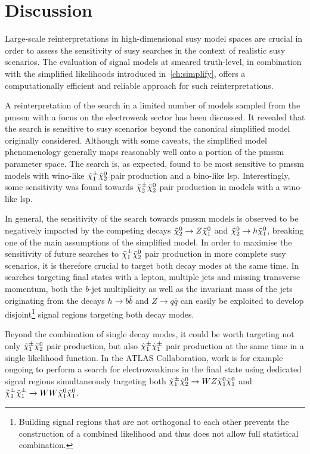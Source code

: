 \section{Discussion}

Large-scale reinterpretations in high-dimensional \gls{susy} model spaces are crucial in order to assess the sensitivity of \gls{susy} searches in the context of realistic \gls{susy} scenarios. The evaluation of signal models at smeared truth-level, in combination with the simplified likelihoods introduced in~\cref{ch:simplify}, offers a computationally efficient and reliable approach for such reinterpretations.

A reinterpretation of the \onelepton search in a limited number of models sampled from the \gls{pmssm} with a focus on the electroweak sector has been discussed. It revealed that the \onelepton search is sensitive to \gls{susy} scenarios beyond the canonical simplified model originally considered.
Although with some caveats, the simplified model phenomenology generally maps reasonably well onto a portion of the \gls{pmssm} parameter space. The \onelepton search is, as expected, found to be most sensitive to \gls{pmssm} models with wino-like $\tilde{\chi}_1^\pm\tilde{\chi}_2^0$ pair production and a bino-like \gls{lsp}. Interestingly, some sensitivity was found towards $\tilde{\chi}^\pm_2\tilde{\chi}_2^0$ pair production in models with a wino-like \gls{lsp}.

In general, the sensitivity of the \onelepton search towards \gls{pmssm} models is observed to be negatively impacted by the competing decays $\tilde{\chi}_2^0 \rightarrow Z \tilde{\chi}_1^0$ and $\tilde{\chi}_2^0 \rightarrow h \tilde{\chi}_1^0$, breaking one of the main assumptions of the simplified model.
In order to maximise the sensitivity of future searches to $\tilde{\chi}_1^\pm\tilde{\chi}_2^0$ pair production in more complete \gls{susy} scenarios, it is therefore crucial to target both decay modes at the same time.
In searches targeting final states with a lepton, multiple jets and missing transverse momentum, both the \textit{b}-jet multiplicity as well as the invariant mass of the jets originating from the decays $h\rightarrow b\bar{b}$ and $Z\rightarrow q\bar{q}$ can easily be exploited to develop disjoint\footnote{Building signal regions that are not orthogonal to each other prevents the construction of a combined likelihood and thus does not allow full statistical combination.} signal regions targeting both decay modes.

Beyond the combination of single decay modes, it could be worth targeting not only $\tilde{\chi}_1^\pm\tilde{\chi}_2^0$ pair production, but also $\tilde{\chi}_1^\pm\tilde{\chi}_1^\pm$ pair production at the same time in a single likelihood function. In the ATLAS Collaboration, work is for example ongoing to perform a search for electroweakinos in the \onelepton final state using dedicated signal regions simultaneously targeting both $\tilde{\chi}_1^\pm\tilde{\chi}_2^0 \rightarrow WZ\tilde{\chi}_1^0\tilde{\chi}_1^0$ and $\tilde{\chi}_1^\pm\tilde{\chi}_1^\pm \rightarrow WW\tilde{\chi}_1^0\tilde{\chi}_1^0$. 

